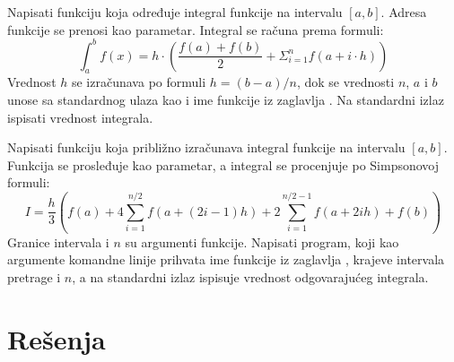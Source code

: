 \begin{Exercise}[label=347]
Napisati funkciju koja određuje integral funkcije  na
intervalu $[a, b]$.  Adresa funkcije  se prenosi kao
parametar. Integral se računa prema formuli:
$$ \int_{a}^{b} f(x) = h \cdot (\frac{f(a)+f(b)}{2} + \Sigma_{i=1}^{n}
f(a+i \cdot h))$$ 
Vrednost $h$ se izračunava po formuli $h = (b-a)/n$, dok se vrednosti $n$, $a$ i $b$ unose sa standardnog
ulaza kao i ime funkcije iz zaglavlja
. Na standardni izlaz ispisati vrednost integrala.
\end{Exercise}
\begin{Answer}[ref=347]
\end{Answer}

\begin{Exercise}[label=348]
Napisati funkciju koja približno izračunava integral      
funkcije  na intervalu $[a, b]$. Funkcija  se prosleđuje
kao parametar, a integral se procenjuje po Simpsonovoj formuli:
$$I = \frac{h}{3}\left(f(a) + 4 \sum_{i=1}^{n/2}f(a+(2i-1)h) + 2  
\sum_{i=1}^{n/2-1}f(a+2ih) + f(b)\right)$$ 
Granice intervala i $n$ su argumenti funkcije. Napisati program, koji kao
argumente komandne linije prihvata ime funkcije iz zaglavlja
, krajeve intervala pretrage i $n$, a na standardni izlaz ispisuje vrednost odgovarajućeg integrala.
\end{Exercise}
\begin{Answer}[ref=348]
\end{Answer}


\section{Rešenja}
\shipoutAnswer
